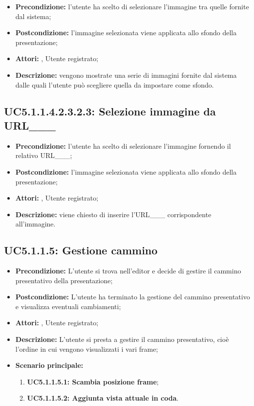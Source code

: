 \begin{itemize}
	\item \textbf{Precondizione:} l’utente ha scelto di selezionare l’immagine tra quelle fornite dal sistema;
	\item \textbf{Postcondizione:} l’immagine selezionata viene applicata allo sfondo della presentazione;
	\item \textbf{Attori:} , Utente registrato;
	\item \textbf{Descrizione:} vengono mostrate una serie di immagini fornite dal sistema dalle quali l’utente può scegliere quella da impostare come sfondo.
\end{itemize}
\subsection{ UC5.1.1.4.2.3.2.3: Selezione immagine da URL___}

\begin{itemize}
	\item \textbf{Precondizione:} l’utente ha scelto di selezionare l’immagine fornendo il relativo URL___;
	\item \textbf{Postcondizione:} l’immagine selezionata viene applicata allo sfondo della presentazione;
	\item \textbf{Attori:} , Utente registrato;
	\item \textbf{Descrizione:} viene chiesto di inserire l’URL___ corrispondente all’immagine.
\end{itemize}
\subsection{ UC5.1.1.5: Gestione cammino}

\begin{itemize}
	\item \textbf{Precondizione:} L’utente si trova nell’editor e decide di gestire il cammino presentativo della presentazione;
	\item \textbf{Postcondizione:} L’utente ha terminato la gestione del cammino presentativo e visualizza eventuali cambiamenti;
	\item \textbf{Attori:} , Utente registrato;
	\item \textbf{Descrizione:} L’utente si presta a gestire il cammino presentativo, cioè l’ordine in cui vengono visualizzati i vari frame;
	\item \textbf{Scenario principale:}
	\begin{enumerate}
		\item \textbf{ UC5.1.1.5.1: Scambia posizione frame};
		\item \textbf{ UC5.1.1.5.2: Aggiunta vista attuale in coda}.
	\end{enumerate}
\end{itemize}

